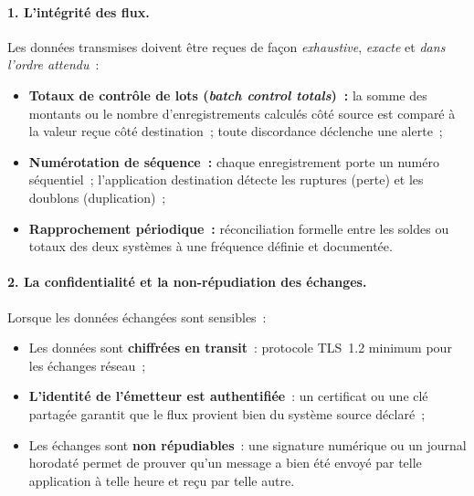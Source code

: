 \paragraph{1. L'intégrité des flux.}
Les données transmises doivent être reçues de façon \emph{exhaustive},
\emph{exacte} et \emph{dans l'ordre attendu}~:
\begin{itemize}
    \item \textbf{Totaux de contrôle de lots (\textit{batch control totals})~:}
        la somme des montants ou le nombre d'enregistrements calculés côté source
        est comparé à la valeur reçue côté destination~; toute discordance déclenche
        une alerte~;
    \item \textbf{Numérotation de séquence~:} chaque enregistrement porte un numéro
        séquentiel~; l'application destination détecte les ruptures (perte) et les
        doublons (duplication)~;
    \item \textbf{Rapprochement périodique~:} réconciliation formelle entre les
        soldes ou totaux des deux systèmes à une fréquence définie et documentée.
\end{itemize}

\paragraph{2. La confidentialité et la non-répudiation des échanges.}
Lorsque les données échangées sont sensibles~:
\begin{itemize}
    \item Les données sont \textbf{chiffrées en transit}~: protocole TLS~1.2 minimum
        pour les échanges réseau~;
    \item \textbf{L'identité de l'émetteur est authentifiée}~: un certificat ou une
        clé partagée garantit que le flux provient bien du système source déclaré~;
    \item Les échanges sont \textbf{non répudiables}~: une signature numérique ou
        un journal horodaté permet de prouver qu'un message a bien été envoyé par
        telle application à telle heure et reçu par telle autre.
\end{itemize}

